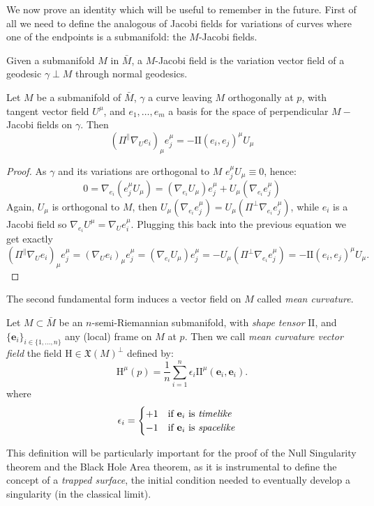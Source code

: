 We now prove an identity which will be useful to remember in the future. First of all we need to define the analogous of Jacobi fields for variations of curves where one of the endpoints is a submanifold: the \(M\)-Jacobi fields.
\begin{definition}
	Given a submanifold \(M\) in \(\bar{M}\), a \(M\)-Jacobi field is the variation vector field of a geodesic \(\gamma \perp M\) through normal geodesics.
\end{definition}
\begin{lemma}
	\label{lemma:shape-identity}
	Let \(M\) be a submanifold of \(\bar{M}\), \(\gamma\) a curve leaving \(M\) orthogonally at \(p\), with tangent vector field \(U^{\mu}\), and \(e_1, \ldots, e_m\) a basis for the space of perpendicular \(M-\)Jacobi fields on \(\gamma\).
	Then 
	\begin{equation}
		(\Pi^{\parallel}\nabla_Ue_i)_{\mu}e_j^{\mu} = - \mathrm{I\!I}(e_i, e_j)^{\mu}U_{\mu}
	\end{equation}
\end{lemma}

	\begin{proof}
		As \(\gamma\) and its variations are orthogonal to \(M\) \(e_j^{\mu}U_{\mu} \equiv 0\), hence:
		\[
		0 = \nabla_{e_i}\left(e_j^{\mu}U_{\mu}\right) = \left(\nabla_{e_i}U_{\mu}\right)e_j^{\mu} + U_{\mu}\left(\nabla_{e_i}e_j^{\mu}\right)
		\]
		Again, \(U_{\mu}\) is orthogonal to \(M\), then \(U_{\mu}  \left(\nabla_{e_i}e_j^{\mu}\right)= U_{\mu}\left(\Pi^{\perp}\nabla_{e_i}e_j^{\mu}\right)\), while \(e_i\) is a Jacobi field so \(\nabla_{e_i}U^{\mu} = \nabla_Ue_i^{\mu}\). Plugging this back into the previous equation we get exactly
		\[
		(\Pi^{\parallel}\nabla_Ue_i)_{\mu}e_j^{\mu} = (\nabla_Ue_i)_{\mu}e_j^{\mu} = (\nabla_{e_i}U_{\mu}) e_j^{\mu} = - U_{\mu}\left(\Pi^{\perp}\nabla_{e_i}e_j^{\mu}\right) = - \mathrm{I\!I}(e_i, e_j)^{\mu}U_{\mu}.
		\]
	\end{proof}
The second fundamental form induces a vector field on \(M\) called \emph{mean curvature}.


\begin{definition}
		Let \(M \subset \bar{M}\) be an \(n\)-semi-Riemannian submanifold, with \emph{shape tensor} \(\mathrm{I\!I}\), and \(\{\textbf{e}_i\}_{i \in \{1, \ldots, n\}}\) any (local) frame on \(M\) at \(p\). Then we call \emph{mean curvature vector field} the field \(\mathrm{H} \in \mathfrak{X}(M)^{\perp} \) defined by:
		\[
		\mathrm{H}^{\mu}(p) = \frac{1}{n} \sum_{i=1}^{n} \epsilon_i \mathrm{I\!I}^{\mu}(\textbf{e}_i, \textbf{e}_i).
		\]
		where 
		\[
		\epsilon_i = 
		\begin{cases}
		+1 \quad \text{if } \textbf{e}_i \text{ is \emph{timelike}} \\
		-1 \quad \text{if } \textbf{e}_i \text{ is \emph{spacelike}}
		\end{cases}
		\]
\end{definition}
This definition will be particularly important for the proof of the Null Singularity theorem and the Black Hole Area theorem, as it is instrumental to define the concept of a \emph{trapped surface}, the initial condition needed to eventually develop a singularity (in the classical limit). 

